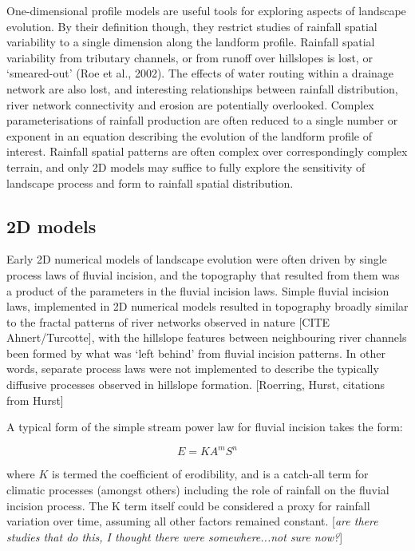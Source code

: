 One-dimensional profile models are useful tools for exploring aspects of landscape evolution. By their definition though, they restrict studies of rainfall spatial variability to a single dimension along the landform profile. Rainfall spatial variability from tributary channels, or from runoff over hillslopes is lost, or `smeared-out' (Roe et al., 2002). The effects of water routing within a drainage network are also lost, and interesting relationships between rainfall distribution, river network connectivity and erosion are potentially overlooked. Complex parameterisations of rainfall production are often reduced to a single number or exponent in an equation describing the evolution of the landform profile of interest. Rainfall spatial patterns are often complex over correspondingly complex terrain, and only 2D models may suffice to fully explore the sensitivity of landscape process and form to rainfall spatial distribution.

\subsection{2D models}
Early 2D numerical models of landscape evolution were often driven by single process laws of fluvial incision, and the topography that resulted from them was a product of the parameters in the fluvial incision laws. Simple fluvial incision laws, implemented in 2D numerical models resulted in topography broadly similar to the fractal patterns of river networks observed in nature [CITE Ahnert/Turcotte], with the hillslope features between neighbouring river channels been formed by what was `left behind' from fluvial incision patterns. In other words, separate process laws were not implemented to describe the typically diffusive processes observed in hillslope formation. [Roerring, Hurst, citations from Hurst]

A typical form of the simple stream power law for fluvial incision takes the form:

\begin{equation}
E = KA^mS^n
\end{equation}

where \(K\) is termed the coefficient of erodibility, and is a catch-all term for climatic processes (amongst others) including the role of rainfall on the fluvial incision process. The K term itself could be considered a proxy for rainfall variation over time, assuming all other factors remained constant. [\textit{are there studies that do this, I thought there were somewhere...not sure now?}]

